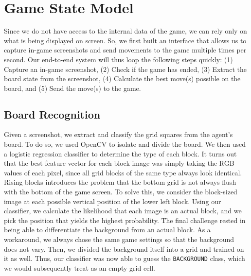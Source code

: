 \documentclass[10pt, final]{article}
\begin{document}
\section{Game State Model}
Since we do not have access to the internal data of the game, we can rely only on what is being displayed on screen. So, we first built an interface that allows us to capture in-game screenshots and send movements to the game multiple times per second. Our end-to-end system will thus loop the following steps quickly: (1) Capture an in-game screenshot, (2) Check if the game has ended, (3) Extract the board state from the screenshot, (4) Calculate the best move(s) possible on the board, and (5) Send the move(s) to the game.

\subsection{Board Recognition}
Given a screenshot, we extract and classify the grid squares from the agent's board. To do so, we used OpenCV to isolate and divide the board. We then used a logistic regression classifier to determine the type of each block. It turns out that the best feature vector for each block image was simply taking the RGB values of each pixel, since all grid blocks of the same type always look identical. Rising blocks introduces the problem that the bottom grid is not always flush with the bottom of the game screen. To solve this, we consider the block-sized image at each possible vertical position of the lower left block. Using our classifier, we calculate the likelihood that each image is an actual block, and we pick the position that yields the highest probability. The final challenge rested in being able to differentiate the background from an actual block. As a workaround, we always chose the same game settings so that the background does not vary. Then, we divided the background itself into a grid and trained on it as well. Thus, our classifier was now able to guess the \texttt{BACKGROUND} class, which we would subsequently treat as an empty grid cell.

\end{document}
